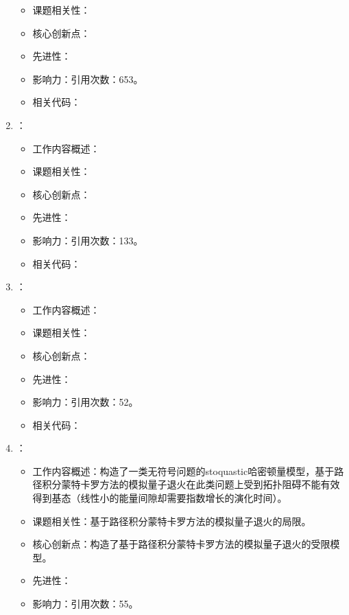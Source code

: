\begin{enumerate}
\begin{itemize}
                \item 课题相关性：
                \item 核心创新点：
                \item 先进性：
                \item 影响力：引用次数：653。
                \item 相关代码：
            \end{itemize}
            \item \citet{bravyi2010complexity}：
            \begin{itemize}
                \item 工作内容概述：
                \item 课题相关性：
                \item 核心创新点：
                \item 先进性：
                \item 影响力：引用次数：133。
                \item 相关代码：
            \end{itemize}
            \item \citet{elgart2012note}：
            \begin{itemize}
                \item 工作内容概述：
                \item 课题相关性：
                \item 核心创新点：
                \item 先进性：
                \item 影响力：引用次数：52。
                \item 相关代码：
            \end{itemize}
            \item \citet{hastings2013obstructions}：
            \begin{itemize}
                \item 工作内容概述：构造了一类无符号问题的stoquastic哈密顿量模型，基于路径积分蒙特卡罗方法的模拟量子退火在此类问题上受到拓扑阻碍不能有效得到基态（线性小的能量间隙却需要指数增长的演化时间）。
                \item 课题相关性：基于路径积分蒙特卡罗方法的模拟量子退火的局限。
                \item 核心创新点：构造了基于路径积分蒙特卡罗方法的模拟量子退火的受限模型。
                \item 先进性：
                \item 影响力：引用次数：55。

\end{itemize}
\end{enumerate}
